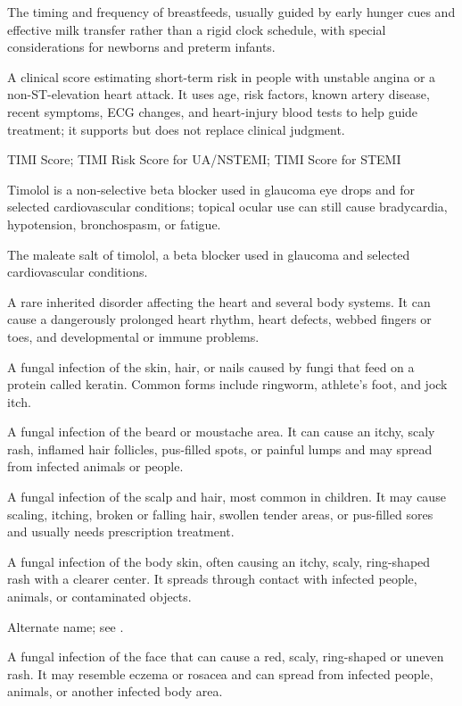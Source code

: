  The timing and frequency of breastfeeds, usually guided by early hunger cues and effective milk transfer rather than a rigid clock schedule, with special considerations for newborns and preterm infants.

 A clinical score estimating short-term risk in people with unstable angina or a non-ST-elevation heart attack. It uses age, risk factors, known artery disease, recent symptoms, ECG changes, and heart-injury blood tests to help guide treatment; it supports but does not replace clinical judgment.

\synonyms
TIMI Score; TIMI Risk Score for UA/NSTEMI; TIMI Score for STEMI

 Timolol is a non-selective beta blocker used in glaucoma eye drops and for selected cardiovascular conditions; topical ocular use can still cause bradycardia, hypotension, bronchospasm, or fatigue.

 The maleate salt of timolol, a beta blocker used in glaucoma and selected cardiovascular conditions.

 A rare inherited disorder affecting the heart and several body systems. It can cause a dangerously prolonged heart rhythm, heart defects, webbed fingers or toes, and developmental or immune problems.

 A fungal infection of the skin, hair, or nails caused by fungi that feed on a protein called keratin. Common forms include ringworm, athlete’s foot, and jock itch.

 A fungal infection of the beard or moustache area. It can cause an itchy, scaly rash, inflamed hair follicles, pus-filled spots, or painful lumps and may spread from infected animals or people.

 A fungal infection of the scalp and hair, most common in children. It may cause scaling, itching, broken or falling hair, swollen tender areas, or pus-filled sores and usually needs prescription treatment.

 A fungal infection of the body skin, often causing an itchy, scaly, ring-shaped rash with a clearer center. It spreads through contact with infected people, animals, or contaminated objects.

 Alternate name; see .

 A fungal infection of the face that can cause a red, scaly, ring-shaped or uneven rash. It may resemble eczema or rosacea and can spread from infected people, animals, or another infected body area.

